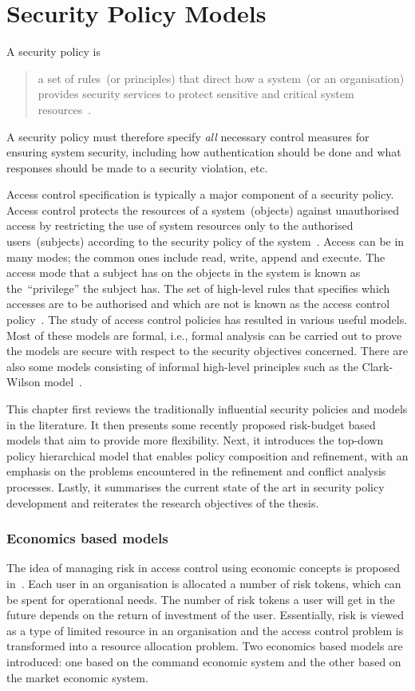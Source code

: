 \chapter{Security Policy Models}
\graphicspath{{Chapter3/figures/}}
\label{SecurityPolicyModels}
A security policy is
\begin{quote}
  a set of rules~(or principles) that direct how a system~(or an
  organisation) provides security services to protect sensitive and
  critical system resources~\cite{RS07}.
\end{quote}
A security policy must therefore specify \emph{all} necessary control
measures for ensuring system security, including how authentication
should be done and what responses should be made to a security
violation, etc.

Access control specification is typically a major component of a
security policy. Access control protects the resources of a
system~(objects) against unauthorised access by restricting the use of
system resources only to the authorised users~(subjects) according to
the security policy of the system~\cite{RS07}. Access can be in many
modes; the common ones include read, write, append and execute. The
access mode that a subject has on the objects in the system is known
as the~``privilege'' the subject has. The set of high-level rules that
specifies which accesses are to be authorised and which are not is
known as the access control policy~\cite{PS01}. The study of access
control policies has resulted in various useful models. Most of these
models are formal, i.e., formal analysis can be carried out to prove
the models are secure with respect to the security objectives
concerned. There are also some models consisting of informal
high-level principles such as the Clark-Wilson model~\cite{DDC87}.

This chapter first reviews the traditionally influential security
policies and models in the literature. It then presents some recently
proposed risk-budget based models that aim to provide more
flexibility. Next, it introduces the top-down policy hierarchical
model that enables policy composition and refinement, with an emphasis
on the problems encountered in the refinement and conflict analysis
processes. Lastly, it summarises the current state of the art in
security policy development and reiterates the research objectives of
the thesis.

\subsection{Economics based models}
\label{JASONEconomicsBasedModel}
The idea of managing risk in access control using economic concepts is
proposed in~\cite{JPO04}. Each user in an organisation is allocated a
number of risk tokens, which can be spent for operational needs. The
number of risk tokens a user will get in the future depends on the
return of investment of the user. Essentially, risk is viewed as a
type of limited resource in an organisation and the access control
problem is transformed into a resource allocation problem. Two
economics based models are introduced: one based on the command
economic system and the other based on the market economic system.

